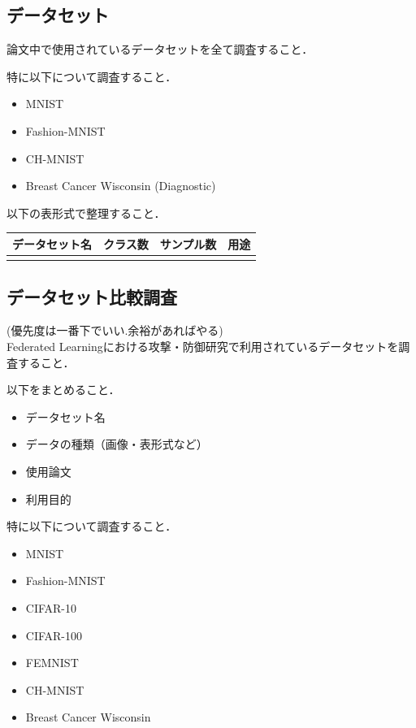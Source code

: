 \documentclass[a4j, twocolumn]{jsarticle}  %
\begin{document}
\subsection{データセット}

論文中で使用されているデータセットを全て調査すること．

特に以下について調査すること．

\begin{itemize}
    \item MNIST
    \item Fashion-MNIST
    \item CH-MNIST
    \item Breast Cancer Wisconsin (Diagnostic)
\end{itemize}

以下の表形式で整理すること．

\begin{center}
\begin{tabular}{|c|c|c|c|}
\hline
データセット名 & クラス数 & サンプル数 & 用途 \\
\hline
 & & & \\
\hline
\end{tabular}
\end{center}

\subsection{データセット比較調査}
(優先度は一番下でいい.余裕があればやる)\\
Federated Learningにおける攻撃・防御研究で利用されているデータセットを調査すること．

以下をまとめること．

\begin{itemize}
    \item データセット名%
    \item データの種類（画像・表形式など）%
    \item 使用論文%
    \item 利用目的%
\end{itemize}

特に以下について調査すること．

\begin{itemize}
    \item MNIST
    \item Fashion-MNIST
    \item CIFAR-10
    \item CIFAR-100
    \item FEMNIST
    \item CH-MNIST
    \item Breast Cancer Wisconsin
\end{itemize}
\end{document}
